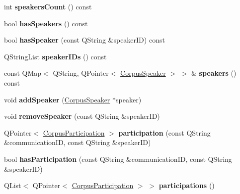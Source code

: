 \begin{DoxyCompactItemize}
\mbox{\label{class_corpus_aad27cde20185492a31efaa395aa7d207}} 
int {\bfseries speakers\+Count} () const
\item 
\mbox{\label{class_corpus_a6245c2836161c1f53122ec7ff1664676}} 
bool {\bfseries has\+Speakers} () const
\item 
\mbox{\label{class_corpus_ad0b26394149fd83fab56d33c5e8fd066}} 
bool {\bfseries has\+Speaker} (const Q\+String \&speaker\+ID) const
\item 
\mbox{\label{class_corpus_a4056b10d0459bf42642662edd6ef2cac}} 
Q\+String\+List {\bfseries speaker\+I\+Ds} () const
\item 
\mbox{\label{class_corpus_aeaefdb0df0474809ebb6175474a25300}} 
const Q\+Map$<$ Q\+String, Q\+Pointer$<$ \hyperlink{class_corpus_speaker}{Corpus\+Speaker} $>$ $>$ \& {\bfseries speakers} () const
\item 
\mbox{\label{class_corpus_a1617afc5ac5f265cd16a1b964056da23}} 
void {\bfseries add\+Speaker} (\hyperlink{class_corpus_speaker}{Corpus\+Speaker} $\ast$speaker)
\item 
\mbox{\label{class_corpus_af6fbce091bf2a5d9199a82d3318ccd27}} 
void {\bfseries remove\+Speaker} (const Q\+String \&speaker\+ID)
\item 
\mbox{\label{class_corpus_aae0f04111009345b6fccd7acdd3e256d}} 
Q\+Pointer$<$ \hyperlink{class_corpus_participation}{Corpus\+Participation} $>$ {\bfseries participation} (const Q\+String \&communication\+ID, const Q\+String \&speaker\+ID)
\item 
\mbox{\label{class_corpus_af0268bc3c38da2fc5aef539f9f51ce74}} 
bool {\bfseries has\+Participation} (const Q\+String \&communication\+ID, const Q\+String \&speaker\+ID)
\item 
\mbox{\label{class_corpus_a69e657d9da48943dcbce81925a705569}} 
Q\+List$<$ Q\+Pointer$<$ \hyperlink{class_corpus_participation}{Corpus\+Participation} $>$ $>$ {\bfseries participations} ()
\item 
\mbox{\label{class_corpus_a7b96f1346c6cc6394b6f2c88ef226767}} 

\end{DoxyCompactItemize}
